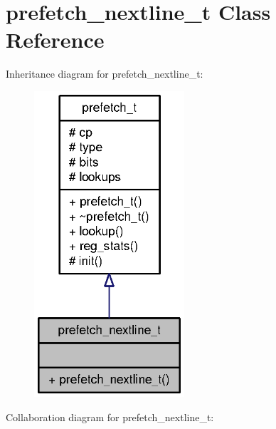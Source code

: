 \section{prefetch\_\-nextline\_\-t Class Reference}
\label{classprefetch__nextline__t}
Inheritance diagram for prefetch\_\-nextline\_\-t:\nopagebreak
\begin{figure}[H]
\begin{center}
\leavevmode
\includegraphics[width=158pt]{classprefetch__nextline__t__inherit__graph}
\end{center}
\end{figure}
Collaboration diagram for prefetch\_\-nextline\_\-t:\nopagebreak
